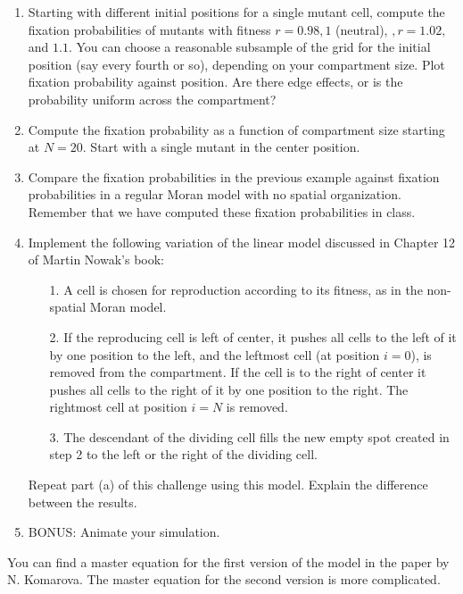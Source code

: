 \documentclass[12pt]{article}
\begin{document}
\begin{enumerate}
 \begin{enumerate}
 \item Starting with different initial positions for a single mutant cell, compute the fixation probabilities 
 of mutants with fitness $r = 0.98, 1$ (neutral), $,r = 1.02,$ and $1.1$.  You can choose a reasonable
 subsample of the grid for the initial position (say every fourth or so), depending on your compartment size.  Plot 
 fixation probability against position.  Are there edge effects, or is the probability uniform across the compartment? 
 \item Compute the fixation probability as a function of compartment size starting at $N = 20$.
 Start with a single mutant in the center position.    
 \item Compare the fixation probabilities in the previous example against fixation probabilities in 
 a regular Moran model with no spatial organization.  Remember that we have computed these 
 fixation probabilities in class. 
\item  Implement the following variation of the linear model discussed in Chapter 12 of Martin Nowak's book:
\begin{enumerate} 
\item[1.] A cell is chosen for reproduction according to its fitness, as in the non-spatial Moran model.
\item[2.] If the reproducing cell is left of center, it pushes all cells to the left of it by one position to the left, and the leftmost cell (at position $i =0$), 
is removed from the compartment.  If the cell is to the right of center it pushes all cells to the right of it by one position to the right.
The rightmost cell at position $i = N$ is removed. 
\item[3.] The descendant of the dividing cell fills the new empty spot created in step 2 to the left or the right of the dividing cell. 
\end{enumerate} 
Repeat part (a) of this challenge using this model.  Explain the difference between the results.
\item BONUS: Animate your simulation.
\end{enumerate}
You can find a master equation for the first version of the model in the paper by N. Komarova.
The master equation for the second version is more complicated.


\end{enumerate}
\end{document}
